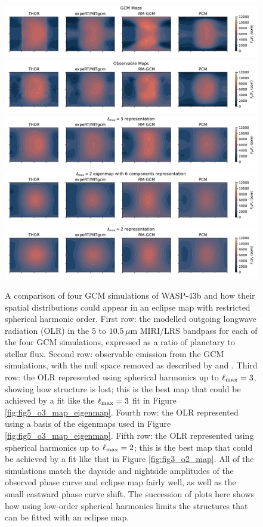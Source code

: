\documentclass[twocolumn]{aastex631}
\begin{document}
\begin{figure}[!t]
    \centering
    \includegraphics[width=\textwidth]{fig7a_gcm_maps.pdf}
    \includegraphics[width=\textwidth]{fig7b_gcm_observable.pdf}
    \includegraphics[width=\textwidth]{fig7c_gcm_o3.pdf}
    \includegraphics[width=\textwidth]{fig7d_gcm_eigen.pdf}
    \includegraphics[width=\textwidth]{fig7e_gcm_o2.pdf}
    \caption{A comparison of four GCM simulations of WASP-43b and how their spatial distributions could appear in an eclipse map with restricted spherical harmonic order. First row: the modelled outgoing longwave radiation (OLR) in the $5$ to $10.5\,\mu$m MIRI/LRS bandpass for each of the four GCM simulations, expressed as a ratio of planetary to stellar flux. Second row: observable emission from the GCM simulations, with the null space removed as described by \citet{luger2021nullspace} and \citet{challener2023nullspace}.  Third row: the OLR represented using spherical harmonics up to $\ell_{\rm max}=3$, showing how structure is lost; this is the best map that could be achieved by a fit like the $\ell_{\rm max}=3$ fit in Figure \ref{fig:fig5_o3_map_eigenmap}. Fourth row: the OLR represented using a basis of the eigenmaps used in Figure \ref{fig:fig5_o3_map_eigenmap}. Fifth row: the OLR represented using spherical harmonics up to $\ell_{\rm max}=2$; this is the best map that could be achieved by a fit like that in Figure \ref{fig:fig3_o2_map}. All of the simulations match the dayside and nightside amplitudes of the observed phase curve and eclipse map fairly well, as well as the small eastward phase curve shift. The succession of plots here shows how using low-order spherical harmonics limits the structures that can be fitted with an eclipse map.}

\end{figure}
\end{document}
